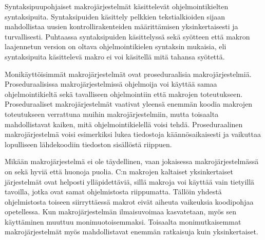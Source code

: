 Syntaksipuupohjaiset makrojärjestelmät käsittelevät ohjelmointikielten
syntaksipuita. Syntaksipuiden käsittely pelkkien tekstialkioiden sijaan
mahdollistaa uusien kontrollirakenteiden määrittämisen yksinkertaisesti ja
turvallisesti. Puhtaassa syntaksipuiden käsittelyssä sekä syötteen että makron
laajennetun version on oltava ohjelmointikielen syntaksin mukaisia, eli
syntaksipuita käsittelevä makro ei voi käsitellä mitä tahansa syötettä.

Monikäyttöisimmät makrojärjestelmät ovat proseduraalisia makrojärjestelmiä.
Proseduraalisissa makrojärjestelmissä ohjelmoija voi käyttää samaa
ohjelmointikieltä sekä tavalliseen ohjelmointiin että makrojen toteutukseen.
Proseduraaliset makrojärjestelmät vaativat yleensä enemmän koodia makrojen
toteutukseen verrattuna muihin makrojärjestelmiin, mutta toisaalta
mahdollistavat kaiken, mitä ohjelmointikielellä voisi tehdä. Proseduraalinen
makrojärjestelmä voisi esimerkiksi lukea tiedostoja käännösaikaisesti ja
vaikuttaa lopulliseen lähdekoodiin tiedoston sisällöstä riippuen.

Mikään makrojärjestelmä ei ole täydellinen, vaan jokaisessa makrojärjestelmässä
on sekä hyviä että huonoja puolia. C:n makrojen kaltaiset yksinkertaiset
järjestelmät ovat helposti ylläpidettäviä, sillä makroja voi käyttää vain
tietyillä tavoilla, jotka ovat samat ohjelmistosta riippumatta. Tällöin yhdestä
ohjelmistosta toiseen siirryttäessä makrot eivät aiheuta vaikeuksia koodipohjaa
opetellessa. Kun makrojärjestelmän ilmaisuvoimaa kasvatetaan, myös sen
käyttäminen muuttuu monimuotoisemmaksi. Toisaalta monimutkaisemmat
makrojärjestelmät myös mahdollistavat enemmän ratkaisuja kuin yksinkertaiset.

%
%
%
%
%
%
%
%
%

